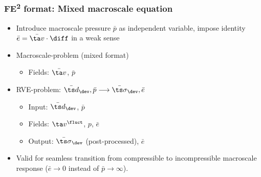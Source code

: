 \documentclass[11pt]{beamer} %
\begin{document}
\begin{frame}
 \frametitle{FE\textsuperscript{2} format: Mixed macroscale equation}
 \begin{itemize}
  \item Introduce macroscale pressure $\bar{p}$ as independent variable, impose identity $\bar{e} = \bar{\ta v}\cdot \diff$ in a weak sense
 \end{itemize}

 \begin{itemize}
  \item Macroscale-problem (mixed format)
  \begin{itemize}
   \item Fields: $\bar{\ta v}$, $\bar{p}$%
  \end{itemize}
  \item RVE-problem: $\bar{\ts d}_\dev, \bar{p} \longrightarrow \bar{\ts\sigma}_\dev, \bar{e}$
  \begin{itemize}
   \item Input: $\bar{\ts d}_\dev$, $\bar{p}$
   \item Fields: $\ta v^\fluct$, $p$, $\bar{e}$%
   \item Output: $\bar{\ts\sigma}_\dev$ (post-processed), $\bar{e}$
  \end{itemize}
 \end{itemize}

 \begin{itemize}
  \item Valid for seamless transition from compressible to incompressible macroscale response ($\bar{e}\to 0$ instead of $\bar{p}\to\infty$).
 \end{itemize}
\end{frame}
\end{document}
